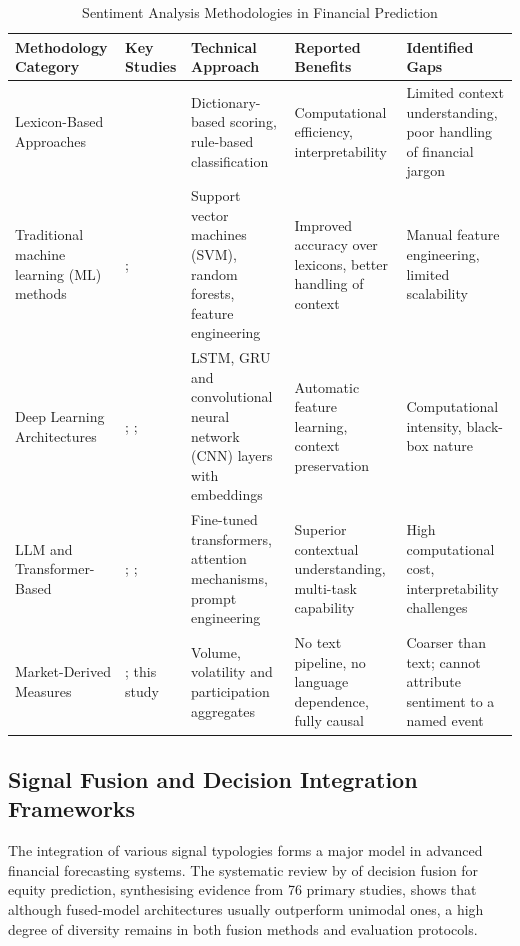 \documentclass{singlecol-new}
\theoremstyle{TH}{
\newtheorem{lemma}{Lemma}
\newtheorem{theorem}[lemma]{Theorem}
\newtheorem{corrolary}[lemma]{Corrolary}
\newtheorem{conjecture}[lemma]{Conjecture}
\newtheorem{proposition}[lemma]{Proposition}
\newtheorem{claim}[lemma]{Claim}
\newtheorem{stheorem}[lemma]{Wrong Theorem}
\newtheorem{algorithm}{Algorithm}
}
\theoremstyle{THrm}{
\newtheorem{definition}{Definition}[section]
\newtheorem{question}{Question}[section]
\newtheorem{remark}{Remark}
\newtheorem{scheme}{Scheme}
}
\theoremstyle{THhit}{
\newtheorem{case}{Case}[section]
}
\begin{document}
\begin{table}[!ht]
\centering
\caption{Sentiment Analysis Methodologies in Financial Prediction}
\label{tab:sentiment_methodologies}
\footnotesize
\begin{tabular}{p{1.9cm}p{2.0cm}p{2.1cm}p{2.0cm}p{2.0cm}}
\hline
\textbf{Methodology Category} & \textbf{Key Studies} & \textbf{Technical Approach} & \textbf{Reported Benefits} & \textbf{Identified Gaps} \\
\hline
Lexicon-Based Approaches & \citet{loughran11} & Dictionary-based scoring, rule-based classification & Computational efficiency, interpretability & Limited context understanding, poor handling of financial jargon \\
\hline
Traditional machine learning (ML) methods & \citet{vargas22}; \citet{wang24} & Support vector machines (SVM), random forests, feature engineering & Improved accuracy over lexicons, better handling of context & Manual feature engineering, limited scalability \\
\hline
Deep Learning Architectures & \citet{mu23}; \citet{bacco24}; \citet{tai22} & LSTM, GRU and convolutional neural network (CNN) layers with embeddings & Automatic feature learning, context preservation & Computational intensity, black-box nature \\
\hline
LLM and Transformer-Based & \citet{jung24}; \citet{liu24}; \citet{onozo24} & Fine-tuned transformers, attention mechanisms, prompt engineering & Superior contextual understanding, multi-task capability & High computational cost, interpretability challenges \\
\hline
Market-Derived Measures & \citet{bakerwurgler07}; this study & Volume, volatility and participation aggregates & No text pipeline, no language dependence, fully causal & Coarser than text; cannot attribute sentiment to a named event \\
\hline
\end{tabular}
\end{table}

\subsection{Signal Fusion and Decision Integration Frameworks}

The integration of various signal typologies forms a major model in advanced financial
forecasting systems. The systematic review by \citet{zhang22} of decision fusion for
equity prediction, synthesising evidence from 76 primary studies, shows that although
fused-model architectures usually outperform unimodal ones, a high degree of diversity
remains in both fusion methods and evaluation protocols.
\end{document}
